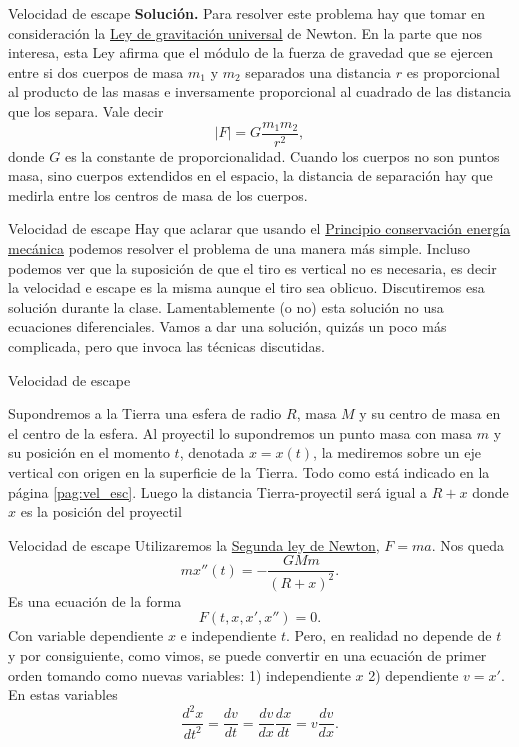 \documentclass[handout,hyperref={colorlinks=true}]{beamer}
\begin{document}
\begin{frame}{Velocidad de escape}
\textbf{Solución.} Para resolver este problema hay que tomar en consideración la 
\href{http://es.wikipedia.org/wiki/Ley_de_gravitación_universal}{Ley de gravitación universal} de Newton. En la parte que nos interesa, esta Ley afirma
que el módulo de la fuerza de gravedad que se ejercen entre si dos cuerpos de masa $m_1$ y $m_2$ separados una distancia $r$ es proporcional al producto de las masas  
e inversamente proporcional al cuadrado de las distancia que los separa. Vale decir
\[|F|=G\frac{m_1m_2}{r^2},\]
donde $G$ es la constante de proporcionalidad.
Cuando los cuerpos no son puntos masa, sino cuerpos extendidos en el espacio, la distancia de separación hay que medirla entre los centros de masa de los cuerpos. 
\end{frame}


\begin{frame}{Velocidad de escape}
Hay que aclarar que usando el \href{https://docs.google.com/file/d/0B80iJ0HgObRRWll6MlJFSjFNMGc/edit}{Principio conservación energía mecánica} podemos resolver
el problema de una manera más simple. Incluso podemos ver que la suposición de que el tiro es vertical no es necesaria, es decir la velocidad e escape es la misma aunque
el tiro sea oblicuo. Discutiremos esa solución durante la clase. Lamentablemente (o no)  esta solución no usa ecuaciones diferenciales.
Vamos a dar una solución, quizás un poco más complicada, pero que invoca las técnicas 
discutidas.

 

\end{frame}

\begin{frame}{Velocidad de escape}
 

Supondremos a la Tierra una esfera de radio $R$, masa $M$ y su centro de masa en el centro de la esfera.   Al proyectil lo supondremos un punto masa 
con masa $m$ y su posición en el momento $t$, denotada $x=x(t)$, la mediremos sobre un eje vertical con origen en la superficie de la Tierra.  Todo como está indicado en la página \ref{pag:vel_esc}. 
Luego la distancia Tierra-proyectil será igual a $R+x$ donde $x$ es la posición del proyectil


\end{frame}

\begin{frame}{Velocidad de escape}
Utilizaremos la \href{http://es.wikipedia.org/wiki/Leyes_de_Newton\#Segunda_ley_de_Newton_o_ley_de_fuerza}{Segunda ley de Newton}, $F=ma$. Nos queda
\[mx''(t)=-\frac{GMm}{(R+x)^2}.\]
Es una ecuación de la forma
\[F(t,x,x',x'')=0.\]
Con variable dependiente $x$ e independiente $t$. Pero, en realidad no depende de $t$ y por consiguiente, como vimos, se puede convertir en una ecuación de primer orden
tomando como nuevas variables: 1) independiente $x$ 2) dependiente $v=x'$. En estas variables
\[\frac{d^2x}{dt^2}=\frac{dv}{dt}=\frac{dv}{dx}\frac{dx}{dt}=v\frac{dv}{dx}.\]


\end{frame}
\end{document}
